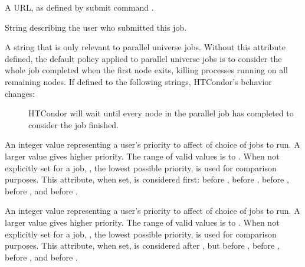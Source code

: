 \begin{description}
\item[\AdAttr{OutputDestination}:]  A URL, as defined by submit command
.

\item[\AdAttr{Owner}:]  String describing the user who submitted this
job.

\item[\AdAttr{ParallelShutdownPolicy}:]  A string that is only relevant
to parallel universe jobs.  Without this attribute defined, the default
policy applied to parallel universe jobs is to consider the whole job
completed when the first node exits, killing processes running on
all remaining nodes.  If defined to the following strings, HTCondor's
behavior changes:
  \begin{description}
  \item[] HTCondor will wait until every node in 
  the parallel job has completed to consider the job finished.
  \end{description}

\item[\AdAttr{PreJobPrio1}:]  An integer value representing a user's
priority to affect of choice of jobs to run.
A larger value gives higher priority. 
The range of valid values is   to .
When not explicitly set for a job,
, the lowest possible priority, is used for comparison purposes.
This attribute, when set, is considered first:
before , before ,
before , before ,
and before .

\item[\AdAttr{PreJobPrio2}:]  An integer value representing a user's
priority to affect of choice of jobs to run.
A larger value gives higher priority. 
The range of valid values is   to .
When not explicitly set for a job,
, the lowest possible priority, is used for comparison purposes.
This attribute, when set, is considered after , 
but before ,
before , before ,
and before .


\end{description}
